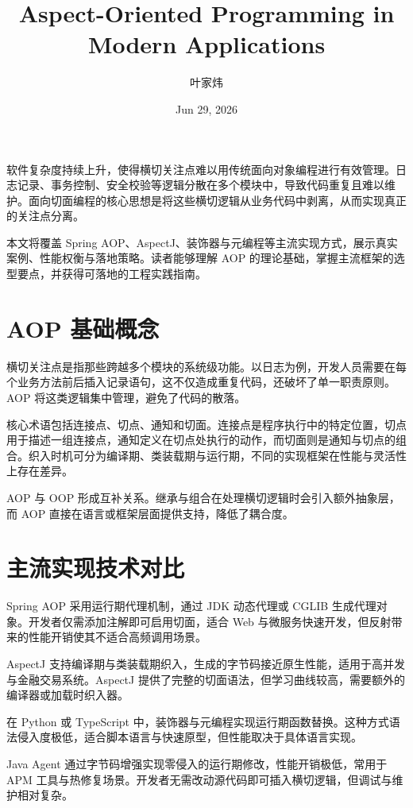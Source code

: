 \title{Aspect-Oriented Programming in Modern Applications}
\author{叶家炜}
\date{Jun 29, 2026}
\maketitle
软件复杂度持续上升，使得横切关注点难以用传统面向对象编程进行有效管理。日志记录、事务控制、安全校验等逻辑分散在多个模块中，导致代码重复且难以维护。面向切面编程的核心思想是将这些横切逻辑从业务代码中剥离，从而实现真正的关注点分离。\par
本文将覆盖 Spring AOP、AspectJ、装饰器与元编程等主流实现方式，展示真实案例、性能权衡与落地策略。读者能够理解 AOP 的理论基础，掌握主流框架的选型要点，并获得可落地的工程实践指南。\par
\chapter{AOP 基础概念}
横切关注点是指那些跨越多个模块的系统级功能。以日志为例，开发人员需要在每个业务方法前后插入记录语句，这不仅造成重复代码，还破坏了单一职责原则。AOP 将这类逻辑集中管理，避免了代码的散落。\par
核心术语包括连接点、切点、通知和切面。连接点是程序执行中的特定位置，切点用于描述一组连接点，通知定义在切点处执行的动作，而切面则是通知与切点的组合。织入时机可分为编译期、类装载期与运行期，不同的实现框架在性能与灵活性上存在差异。\par
AOP 与 OOP 形成互补关系。继承与组合在处理横切逻辑时会引入额外抽象层，而 AOP 直接在语言或框架层面提供支持，降低了耦合度。\par
\chapter{主流实现技术对比}
Spring AOP 采用运行期代理机制，通过 JDK 动态代理或 CGLIB 生成代理对象。开发者仅需添加注解即可启用切面，适合 Web 与微服务快速开发，但反射带来的性能开销使其不适合高频调用场景。\par
AspectJ 支持编译期与类装载期织入，生成的字节码接近原生性能，适用于高并发与金融交易系统。AspectJ 提供了完整的切面语法，但学习曲线较高，需要额外的编译器或加载时织入器。\par
在 Python 或 TypeScript 中，装饰器与元编程实现运行期函数替换。这种方式语法侵入度极低，适合脚本语言与快速原型，但性能取决于具体语言实现。\par
Java Agent 通过字节码增强实现零侵入的运行期修改，性能开销极低，常用于 APM 工具与热修复场景。开发者无需改动源代码即可插入横切逻辑，但调试与维护相对复杂。\par
